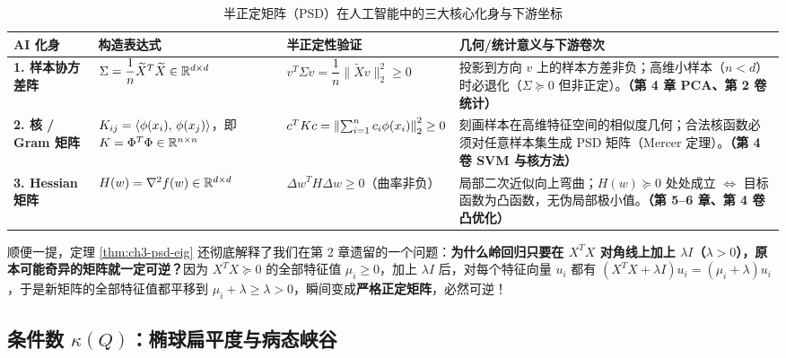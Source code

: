 \begin{table}[htbp]
  \centering
  \caption{半正定矩阵（PSD）在人工智能中的三大核心化身与下游坐标}
  \label{tab:ch3-psd-three}
  \small
  \begin{tabularx}{\linewidth}{@{}p{26mm}p{35mm}p{35mm}X@{}}
    \toprule
    \textbf{AI 化身} & \textbf{构造表达式} & \textbf{半正定性验证} & \textbf{几何/统计意义与下游卷次} \\
    \midrule
    \textbf{1. 样本协方差阵} & $\Sigma = \dfrac{1}{n}\widetilde{X}^T\widetilde{X} \in \mathbb{R}^{d\times d}$ & $v^T \Sigma v = \dfrac{1}{n}\|\widetilde{X}v\|_2^2 \ge 0$ & 投影到方向 $v$ 上的样本方差非负；高维小样本（$n<d$）时必退化（$\Sigma \succeq 0$ 但非正定）。\textbf{（第 4 章 PCA、第 2 卷统计）} \\[3pt]
    \textbf{2. 核 / Gram 矩阵} & $K_{ij} = \left\langle \phi(x_i),\, \phi(x_j) \right\rangle$，即 $K = \Phi^T \Phi \in \mathbb{R}^{n\times n}$ & $c^T K c = \left\|\sum_{i=1}^n c_i \phi(x_i)\right\|_2^2 \ge 0$ & 刻画样本在高维特征空间的相似度几何；合法核函数必须对任意样本集生成 PSD 矩阵（Mercer 定理）。\textbf{（第 4 卷 SVM 与核方法）} \\[3pt]
    \textbf{3. Hessian 矩阵} & $H(w) = \nabla^2 f(w) \in \mathbb{R}^{d\times d}$ & $\Delta w^T H \Delta w \ge 0$（曲率非负） & 局部二次近似向上弯曲；$H(w) \succeq 0$ 处处成立 $\iff$ 目标函数为凸函数，无伪局部极小值。\textbf{（第 5--6 章、第 4 卷凸优化）} \\
    \bottomrule
  \end{tabularx}
\end{table}

顺便一提，定理 \ref{thm:ch3-psd-eig} 还彻底解释了我们在第 2 章遗留的一个问题：\textbf{为什么岭回归只要在 $X^T X$ 对角线上加上 $\lambda I$（$\lambda > 0$），原本可能奇异的矩阵就一定可逆？}因为 $X^T X \succeq 0$ 的全部特征值 $\mu_i \ge 0$，加上 $\lambda I$ 后，对每个特征向量 $u_i$ 都有 $(X^T X + \lambda I)u_i = (\mu_i + \lambda)u_i$，于是新矩阵的全部特征值都平移到 $\mu_i + \lambda \ge \lambda > 0$，瞬间变成\textbf{严格正定矩阵}，必然可逆！

\subsection{条件数 $\kappa(Q)$：椭球扁平度与病态峡谷}

